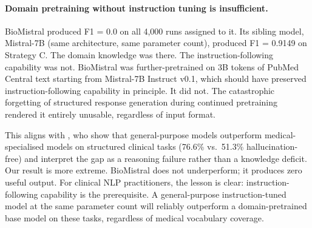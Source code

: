 \paragraph{Domain pretraining without instruction tuning is insufficient.}
BioMistral produced F1 = 0.0 on all 4,000 runs assigned to it. Its sibling model,
Mistral-7B (same architecture, same parameter count), produced F1 = 0.9149 on
Strategy C. The domain knowledge was there. The instruction-following capability was
not. BioMistral was further-pretrained on 3B tokens of PubMed Central text starting
from Mistral-7B Instruct v0.1, which should have preserved instruction-following
capability in principle. It did not. The catastrophic forgetting of structured
response generation during continued pretraining rendered it entirely unusable,
regardless of input format.

This aligns with \citet{kim2025medicalhallucination}, who show that general-purpose
models outperform medical-specialised models on structured clinical tasks (76.6\% vs.\
51.3\% hallucination-free) and interpret the gap as a reasoning failure rather than a
knowledge deficit. Our result is more extreme. BioMistral does not underperform; it
produces zero useful output. For clinical NLP practitioners, the lesson is clear:
instruction-following capability is the prerequisite. A general-purpose instruction-tuned
model at the same parameter count will reliably outperform a domain-pretrained base
model on these tasks, regardless of medical vocabulary coverage.
